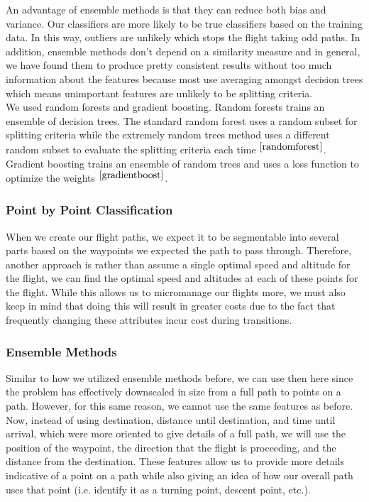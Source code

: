 \documentclass{article}[12pt]
\begin{document}
\begin{multicols}{2}
An advantage of ensemble methods is that they can reduce both bias and variance. Our classifiers are more likely to be true classifiers based on the training data. In this way, outliers are unlikely which stops the flight taking odd paths. In addition, ensemble methods don't depend on a similarity measure and in general, we have found them to produce pretty consistent results without too much information about the features because most use averaging amongst decision trees which means unimportant features are unlikely to be splitting criteria.\\

We used random forests and gradient boosting. Random forests trains an ensemble of decision trees. The standard random forest uses a random subset for splitting criteria while the extremely random trees method uses a different random subset to evaluate the splitting criteria each time $^{\cite{randomforest}}$. Gradient boosting trains an ensemble of random trees and uses a loss function to optimize the weights $^{\cite{gradientboost}}$.

\subsubsection{Point by Point Classification}

When we create our flight paths, we expect it to be segmentable into several parts based on the waypoints we expected the path to pass through. Therefore, another approach is rather than assume a single optimal speed and altitude for the flight, we can find the optimal speed and altitudes at each of these points for the flight. While this allows us to micromanage our flights more, we must also keep in mind that doing this will result in greater costs due to the fact that frequently changing these attributes incur cost during transitions.

\subsubsection{Ensemble Methods}

Similar to how we utilized ensemble methods before, we can use then here since the problem has effectively downscaled in size from a full path to points on a path. However, for this same reason, we cannot use the same features as before. Now, instead of using destination, distance until destination, and time until arrival, which were more oriented to give details of a full path, we will use the position of the waypoint, the direction that the flight is proceeding, and the distance from the destination. These features allow us to provide more details indicative of a point on a path while also giving an idea of how our overall path uses that point (i.e. identify it as a turning point, descent point, etc.).


\end{multicols}
\end{document}
